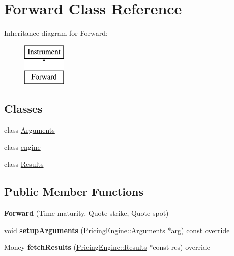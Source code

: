 \hypertarget{class_forward}{}\section{Forward Class Reference}
\label{class_forward}
Inheritance diagram for Forward\+:\begin{figure}[H]
\begin{center}
\leavevmode
\includegraphics[height=2.000000cm]{class_forward}
\end{center}
\end{figure}
\subsection*{Classes}
\begin{DoxyCompactItemize}
\item 
class \hyperlink{class_forward_1_1_arguments}{Arguments}
\item 
class \hyperlink{class_forward_1_1engine}{engine}
\item 
class \hyperlink{class_forward_1_1_results}{Results}
\end{DoxyCompactItemize}
\subsection*{Public Member Functions}
\begin{DoxyCompactItemize}
\item 
\hypertarget{class_forward_a7ec14e1a089290cae0e70c4cddd353b5}{}\label{class_forward_a7ec14e1a089290cae0e70c4cddd353b5} 
{\bfseries Forward} (Time maturity, Quote strike, Quote spot)
\item 
\hypertarget{class_forward_ad6208ba4ee03c396e611c142be735b26}{}\label{class_forward_ad6208ba4ee03c396e611c142be735b26} 
void {\bfseries setup\+Arguments} (\hyperlink{class_pricing_engine_1_1_arguments}{Pricing\+Engine\+::\+Arguments} $\ast$arg) const override
\item 
\hypertarget{class_forward_ab1e2edeb8345c8605013634a598d1ae5}{}\label{class_forward_ab1e2edeb8345c8605013634a598d1ae5} 
Money {\bfseries fetch\+Results} (\hyperlink{class_pricing_engine_1_1_results}{Pricing\+Engine\+::\+Results} $\ast$const res) override
\end{DoxyCompactItemize}

